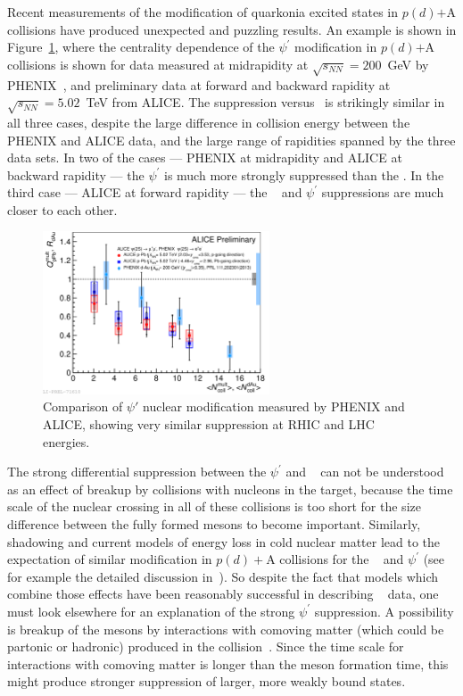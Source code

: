 Recent measurements of the modification of quarkonia excited states in
$p(d)$$+$A collisions have produced unexpected and puzzling
results. An example is shown in Figure~\ref{fig:psiprime_rhic_lhc},
where the centrality dependence of the $\psi^{\prime}$ modification in
$p(d)$$+$A collisions is shown for data measured at midrapidity at
$\sqrt{s_{NN}}=200$~GeV by PHENIX~\cite{Adare:2013ezl}, and
preliminary data at forward and backward rapidity at
$\sqrt{s_{NN}}=5.02$~TeV from ALICE. The suppression versus \ncoll~is
strikingly similar in all three cases, despite the large difference in
collision energy between the PHENIX and ALICE data, and the large
range of rapidities spanned by the three data sets. In two of the
cases --- PHENIX at midrapidity and ALICE at backward rapidity --- the
$\psi^{\prime}$ is much more strongly suppressed than the \jpsi. In
the third case --- ALICE at forward rapidity --- the \jpsi~ and
$\psi^{\prime}$ suppressions are much closer to each other.

\begin{figure}
  \begin{center}
    \includegraphics[width=0.6\textwidth]{figs/psiprime_PHENIX_ALICE_vs_Ncoll}
  \end{center}
  \caption{\label{fig:psiprime_rhic_lhc} Comparison of $\psi'$ nuclear
    modification measured by PHENIX and ALICE, showing very similar
    suppression at RHIC and LHC energies. }
\end{figure}

The strong differential suppression between the $\psi^{\prime}$ and
\jpsi~ can not be understood as an effect of breakup by collisions
with nucleons in the target, because the time scale of the nuclear
crossing in all of these collisions is too short for the size
difference between the fully formed mesons to become
important. Similarly, shadowing and current models of energy loss in
cold nuclear matter lead to the expectation of similar modification in
$p(d)+$A collisions for the \jpsi~ and $\psi^{\prime}$ (see for
example the detailed discussion in~\cite{Ferreiro:2012mm}).  So
despite the fact that models which combine those effects have been
reasonably successful in describing \jpsi~ data, one must look
elsewhere for an explanation of the strong $\psi^{\prime}$
suppression. A possibility is breakup of the mesons by interactions
with comoving matter (which could be partonic or hadronic) produced in
the collision~\cite{Capella:1996va}. Since the time scale for
interactions with comoving matter is longer than the meson formation
time, this might produce stronger suppression of larger, more weakly
bound states.

